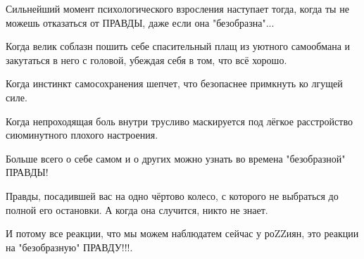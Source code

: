  
 
 
 
 

Сильнейший момент психологического взросления наступает тогда, когда ты не
можешь отказаться от ПРАВДЫ, даже если она "безобразна"...

Когда велик соблазн пошить себе спасительный плащ из уютного самообмана и
закутаться в него с головой, убеждая себя в том, что всё хорошо.

Когда инстинкт самосохранения шепчет, что безопаснее примкнуть ко лгущей силе.

Когда непроходящая боль внутри трусливо маскируется под лёгкое расстройство
сиюминутного плохого настроения.

Больше всего о себе самом и о других можно узнать во времена "безобразной"
ПРАВДЫ!

Правды, посадившей вас на одно чёртово колесо, с которого не выбраться до
полной его остановки. А когда она случится, никто не знает.

И потому все реакции, что мы можем наблюдатем сейчас у роZZиян, это реакции на
"безобразную" ПРАВДУ!!!.
